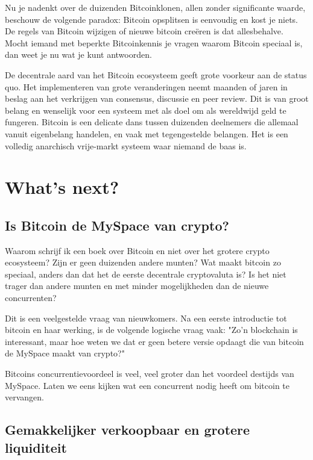 \documentclass[
  letterpaper,
]{scrbook}
\begin{document}
Nu je nadenkt over de duizenden Bitcoinklonen, allen zonder significante
waarde, beschouw de volgende paradox: Bitcoin opsplitsen is eenvoudig en
kost je niets. De regels van Bitcoin wijzigen of nieuwe bitcoin creëren
is dat allesbehalve. Mocht iemand met beperkte Bitcoinkennis je vragen
waarom Bitcoin speciaal is, dan weet je nu wat je kunt antwoorden.

De decentrale aard van het Bitcoin ecosysteem geeft grote voorkeur aan
de status quo. Het implementeren van grote veranderingen neemt maanden
of jaren in beslag aan het verkrijgen van consensus, discussie en peer
review. Dit is van groot belang en wenselijk voor een systeem met als
doel om als wereldwijd geld te fungeren. Bitcoin is een delicate dans
tussen duizenden deelnemers die allemaal vanuit eigenbelang handelen, en
vaak met tegengestelde belangen. Het is een volledig anarchisch
vrije-markt systeem waar niemand de baas is.

\hypertarget{whats-next}{%
\chapter{What's next?}\label{whats-next}}

\hypertarget{is-bitcoin-de-myspace-van-crypto}{%
\section{Is Bitcoin de MySpace van
crypto?}\label{is-bitcoin-de-myspace-van-crypto}}

Waarom schrijf ik een boek over Bitcoin en niet over het grotere crypto
ecosysteem? Zijn er geen duizenden andere munten? Wat maakt bitcoin zo
speciaal, anders dan dat het de eerste decentrale cryptovaluta is? Is
het niet trager dan andere munten en met minder mogelijkheden dan de
nieuwe concurrenten?

Dit is een veelgestelde vraag van nieuwkomers. Na een eerste introductie
tot bitcoin en haar werking, is de volgende logische vraag vaak: "Zo'n
blockchain is interessant, maar hoe weten we dat er geen betere versie
opdaagt die van bitcoin de MySpace maakt van crypto?"

Bitcoins concurrentievoordeel is veel, veel groter dan het voordeel
destijds van MySpace. Laten we eens kijken wat een concurrent nodig
heeft om bitcoin te vervangen.

\hypertarget{gemakkelijker-verkoopbaar-en-grotere-liquiditeit}{%
\section{Gemakkelijker verkoopbaar en grotere
liquiditeit}\label{gemakkelijker-verkoopbaar-en-grotere-liquiditeit}}
\end{document}
